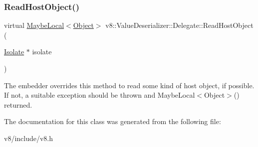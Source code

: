 \subsubsection{\texorpdfstring{Read\+Host\+Object()}{ReadHostObject()}}
{\footnotesize\ttfamily virtual \mbox{\hyperlink{classv8_1_1MaybeLocal}{Maybe\+Local}}$<$\mbox{\hyperlink{classv8_1_1Object}{Object}}$>$ v8\+::\+Value\+Deserializer\+::\+Delegate\+::\+Read\+Host\+Object (\begin{DoxyParamCaption}\item[{\mbox{\hyperlink{classv8_1_1Isolate}{Isolate}} $\ast$}]{isolate }\end{DoxyParamCaption})\hspace{0.3cm}{\ttfamily [virtual]}}

The embedder overrides this method to read some kind of host object, if possible. If not, a suitable exception should be thrown and Maybe\+Local$<$\+Object$>$() returned. 

The documentation for this class was generated from the following file\+:\begin{DoxyCompactItemize}
\item 
v8/include/v8.\+h\end{DoxyCompactItemize}
